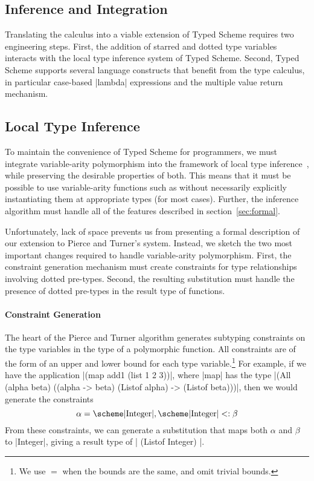\begin{schemeregion}
\section{Inference and Integration}
\label{sec:infer}

Translating the calculus into a viable extension of Typed Scheme
requires two engineering steps.  First, the addition of starred and
dotted type variables interacts with the local type inference system
of Typed Scheme.  Second, Typed Scheme supports several language
constructs that benefit from the type calculus, in particular
case-based \scheme|lambda| expressions and the multiple value return
mechanism.  


\subsection{Local Type Inference}

To maintain the convenience of Typed Scheme for programmers,
we must integrate variable-arity polymorphism into the
framework of local type inference~\cite{pierce:lti},
 while preserving the desirable
properties of both.  This means that it must be possible to use
variable-arity functions such as  without necessarily
explicitly instantiating them at appropriate types (for most cases).  Further, the
inference algorithm must handle all of the features described in
section~\ref{sec:formal}.  

Unfortunately, lack of space prevents us from presenting a formal
description of our extension to Pierce and Turner's system.
Instead,  we sketch the two most important changes required to handle
variable-arity polymorphism.
 First, the constraint generation mechanism must create
constraints for type relationships involving dotted pre-types.
Second, the resulting substitution must handle the presence of
dotted pre-types in the result type of functions.

\paragraph{Constraint Generation}

The heart of the Pierce and Turner algorithm  generates
subtyping constraints on the type variables in the type of a
polymorphic function.  
 All constraints are of the form of an
upper and lower bound for each type variable.\footnote{We use $=$ when the bounds are the same, and omit trivial bounds.}
For example, if we have the 
application \scheme|(map add1 (list 1 2 3))|, where \scheme|map| has the type \scheme|(All (alpha beta) ((alpha ->
beta) (Listof alpha) -> (Listof beta)))|,
then we would generate the constraints  
\[\alpha =
\hbox{\scheme|Integer|}, \hbox{\scheme|Integer|} <: \beta\]
 From
these constraints, we can generate a substitution that maps both
$\alpha$ and $\beta$ to \scheme|Integer|, giving a result type of
\scheme| (Listof Integer) |. 



\end{schemeregion}
